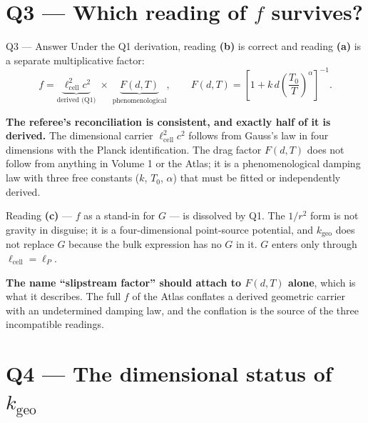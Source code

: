 \documentclass[11pt,letterpaper]{article}
\newcommand{\kgeo}{k_{\mathrm{geo}}}
\newcommand{\lcell}{\ell_{\mathrm{cell}}}
\newcommand{\lP}{\ell_{P}}
\begin{document}
\section{Q3 --- Which reading of $f$ survives?}

\begin{answerbox}{Q3 --- Answer}
Under the Q1 derivation, reading \textbf{(b)} is correct and reading \textbf{(a)} is a
separate multiplicative factor:
\[
f = \underbrace{\lcell^2 c^2}_{\text{derived (Q1)}} \;\times\;
\underbrace{F(d,T)}_{\text{phenomenological}},
\qquad F(d,T) = \left[1 + k\,d\left(\frac{T_0}{T}\right)^{\alpha}\right]^{-1}.
\]

\medskip
\textbf{The referee's reconciliation is consistent, and exactly half of it is derived.} The
dimensional carrier $\lcell^2 c^2$ follows from Gauss's law in four dimensions with the Planck
identification. The drag factor $F(d,T)$ does not follow from anything in Volume 1 or the
Atlas; it is a phenomenological damping law with three free constants ($k$, $T_0$, $\alpha$)
that must be fitted or independently derived.

\medskip
Reading \textbf{(c)} --- $f$ as a stand-in for $G$ --- is dissolved by Q1. The $1/r^2$ form is
not gravity in disguise; it is a four-dimensional point-source potential, and $\kgeo$ does not
replace $G$ because the bulk expression has no $G$ in it. $G$ enters only through
$\lcell = \lP$.

\medskip
\textbf{The name ``slipstream factor'' should attach to $F(d,T)$ alone}, which is what it
describes. The full $f$ of the Atlas conflates a derived geometric carrier with an undetermined
damping law, and the conflation is the source of the three incompatible readings.
\end{answerbox}

\section{Q4 --- The dimensional status of $\kgeo$}
\end{document}
